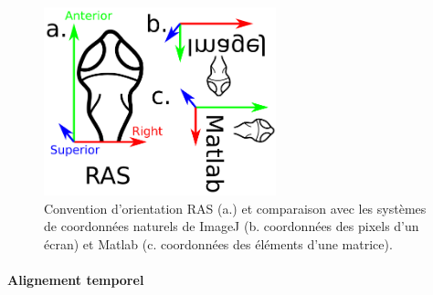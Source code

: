 \begin{figure}
    \centering
    \includegraphics[width=0.6\textwidth]{./files/RAST.svg.png}
    \caption{Convention d'orientation RAS (a.) et comparaison avec les systèmes de coordonnées naturels de ImageJ (b. coordonnées des pixels d'un écran) et Matlab (c. coordonnées des éléments d'une matrice).}
    \end{figure}


\paragraph{Alignement temporel}


